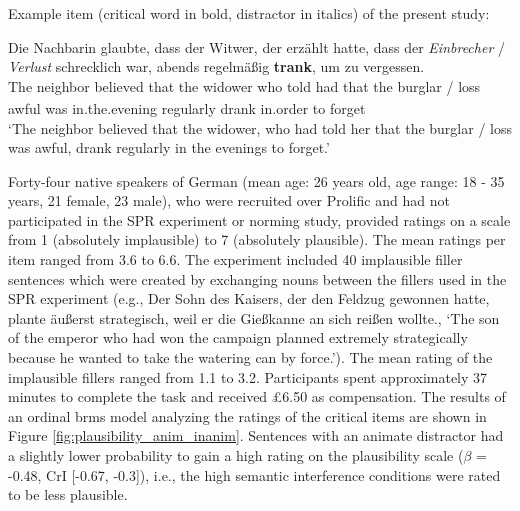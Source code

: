 \documentclass[review,preprint,12pt,authoryear,floatsintext]{elsarticle}
\begin{document}
\begin{exe}  
\ex \label{ex:materials_repeat} Example item (critical word in bold, distractor in italics) of the present study:
    \begin{xlist}   
    \label{ex:hisyn_repeat} 
    \gll Die  Nachbarin glaubte,	dass	der Witwer,  der  erzählt hatte, dass der \textit{Einbrecher} / \textit{Verlust}  schrecklich war, abends regelmäßig \textbf{trank}, um zu vergessen.\\ 
    The\textsubscript{} neighbor\textsubscript{} believed that the widower who told had that the burglar / loss awful was in.the.evening regularly drank in.order to forget \\
    \trans `The neighbor believed that the widower, who had told her that the burglar / loss was awful, drank regularly in the evenings to forget.' \\
    \end{xlist}
\end{exe}

Forty-four native speakers of German (mean age: 26 years old, age range: 18 - 35 years, 21 female, 23 male), who were recruited over Prolific and had not participated in the SPR experiment or norming study, provided ratings on a scale from 1 (absolutely implausible) to 7 (absolutely plausible). The mean ratings per item ranged from 3.6 to 6.6. The experiment included 40 implausible filler sentences which were created by exchanging nouns between the fillers used in the SPR experiment (e.g., Der Sohn des Kaisers, der den Feldzug gewonnen hatte, plante äußerst strategisch, weil er die Gießkanne an sich reißen wollte., `The son of the emperor who had won the campaign planned extremely strategically because he wanted to take the watering can by force.').  The mean rating of the implausible fillers ranged from 1.1 to 3.2. Participants spent approximately 37 minutes to complete the task and received \pounds 6.50 as compensation. The results of an ordinal brms model analyzing the ratings of the critical items are shown in Figure \ref{fig:plausibility_anim_inanim}. Sentences with an animate distractor had a slightly lower probability to gain a high rating on the plausibility scale ($\beta$ = -0.48, CrI [-0.67, -0.3]), i.e., the high semantic interference conditions were rated to be less plausible.
\end{document}
